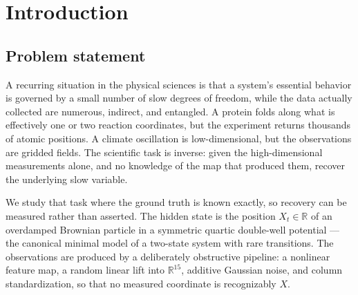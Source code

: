 \documentclass[11pt]{article}
\newcommand{\R}{\mathbb{R}}
\begin{document}
\begin{abstract}
We also report a metric failure worth guarding against: at very small bandwidth
the kernel becomes nearly reducible, and the resulting eigenvector --- effectively
a two-point component indicator, constant elsewhere to within $4\times10^{-8}$ ---
still returns $\lvert\rho_{\mathrm{Spearman}}\rvert = 0.9997$. Rank correlation is
scale-free and cannot tell that the ordering lies eight orders of magnitude below
the coordinate's full range. We use a conservative MST-scale-constrained
bandwidth scan and diagnostics for near-unit eigenvalues and coordinate collapse.
The practical rule is to choose $\alpha$ from the question, inspect the spectrum,
and never read a diffusion-map score without checking kernel conditioning.
\end{abstract}

\tableofcontents
\newpage

\section{Introduction}

\subsection{Problem statement}

A recurring situation in the physical sciences is that a system's essential
behavior is governed by a small number of slow degrees of freedom, while the
data actually collected are numerous, indirect, and entangled. A protein folds
along what is effectively one or two reaction coordinates, but the experiment
returns thousands of atomic positions. A climate oscillation is
low-dimensional, but the observations are gridded fields. The scientific task is
inverse: given the high-dimensional measurements alone, and no knowledge of the
map that produced them, recover the underlying slow variable.

We study that task where the ground truth is known exactly, so recovery can be
measured rather than asserted. The hidden state is the position $X_t \in \R$ of
an overdamped Brownian particle in a symmetric quartic double-well potential ---
the canonical minimal model of a two-state system with rare transitions. The
observations are produced by a deliberately obstructive pipeline: a nonlinear
feature map, a random linear lift into $\R^{15}$, additive Gaussian noise, and
column standardization, so that no measured coordinate is recognizably $X$.
\end{document}
